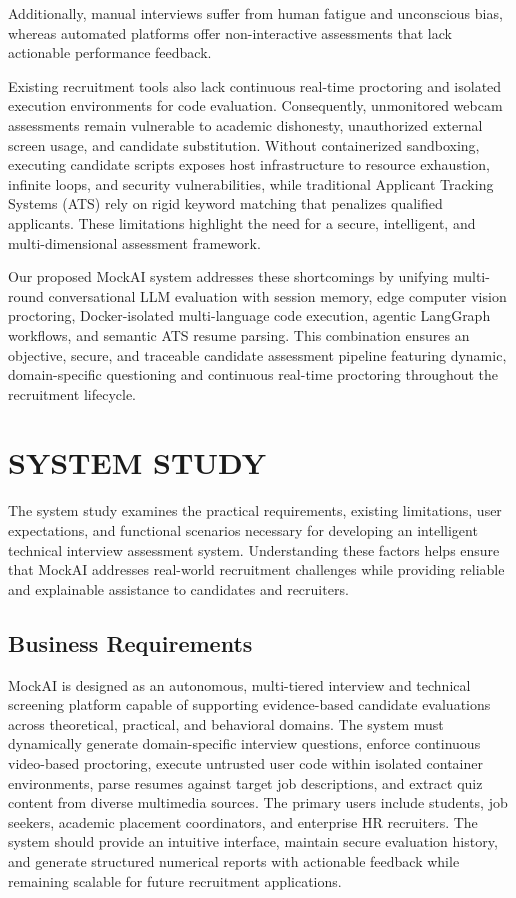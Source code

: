 \documentclass[12pt,a4paper]{report}
\begin{document}
Additionally, manual interviews suffer from human fatigue and unconscious bias, whereas
automated platforms offer non-interactive assessments that lack actionable performance
feedback.

Existing recruitment tools also lack continuous real-time proctoring and isolated execution
environments for code evaluation. Consequently, unmonitored webcam assessments remain
vulnerable to academic dishonesty, unauthorized external screen usage, and candidate
substitution. Without containerized sandboxing, executing candidate scripts exposes host
infrastructure to resource exhaustion, infinite loops, and security vulnerabilities, while
traditional Applicant Tracking Systems (ATS) rely on rigid keyword matching that penalizes
qualified applicants. These limitations highlight the need for a secure, intelligent, and
multi-dimensional assessment framework.

Our proposed MockAI system addresses these shortcomings by unifying multi-round
conversational LLM evaluation with session memory, edge computer vision proctoring,
Docker-isolated multi-language code execution, agentic LangGraph workflows, and
semantic ATS resume parsing. This combination ensures an objective, secure, and traceable
candidate assessment pipeline featuring dynamic, domain-specific questioning and
continuous real-time proctoring throughout the recruitment lifecycle.

\section{SYSTEM STUDY}

The system study examines the practical requirements, existing limitations, user
expectations, and functional scenarios necessary for developing an intelligent technical
interview assessment system. Understanding these factors helps ensure that MockAI
addresses real-world recruitment challenges while providing reliable and explainable
assistance to candidates and recruiters.

\subsection{Business Requirements}

MockAI is designed as an autonomous, multi-tiered interview and technical screening
platform capable of supporting evidence-based candidate evaluations across theoretical,
practical, and behavioral domains. The system must dynamically generate domain-specific
interview questions, enforce continuous video-based proctoring, execute untrusted user
code within isolated container environments, parse resumes against target job descriptions,
and extract quiz content from diverse multimedia sources. The primary users include
students, job seekers, academic placement coordinators, and enterprise HR recruiters. The
system should provide an intuitive interface, maintain secure evaluation history, and
generate structured numerical reports with actionable feedback while remaining scalable
for future recruitment applications.
\end{document}
